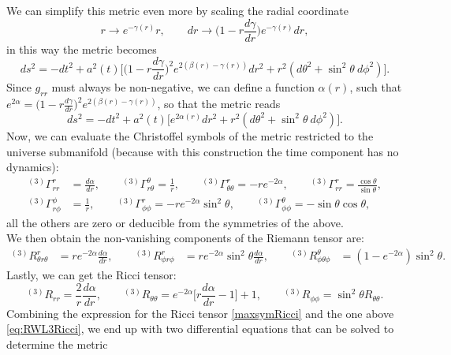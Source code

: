 We can simplify this metric even more by scaling the radial coordinate
\begin{equation*}
    r\rightarrow e^{-\gamma(r)}r,\qquad dr\rightarrow \bigg(1-r\frac{d\gamma}{dr}\bigg)e^{-\gamma(r)}dr,
\end{equation*}
in this way the metric becomes
\begin{equation*}
    ds^2=-dt^2+a^2(t)\Bigg[\bigg(1-r\frac{d\gamma}{dr}\bigg)^{2}e^{2(\beta(r)-\gamma(r))}dr^2+r^2(d\theta^2+\sin^2\theta\ d\phi^2)\Bigg].
\end{equation*}
Since $g_{rr}$ must always be non-negative, we can define a function $\alpha(r)$, such that $e^{2\alpha}=\big(1-r\frac{d\gamma}{dr}\big)^{2}e^{2(\beta(r)-\gamma(r))}$, so that the metric reads
\begin{equation*}
    ds^2=-dt^2+a^2(t)\big[e^{2\alpha(r)}dr^2+r^2(d\theta^2+\sin^2\theta\ d\phi^2)\big].
\end{equation*}
Now, we can evaluate the Christoffel symbols of the metric restricted to the universe submanifold (because with this construction the time component has no dynamics):
\begin{align}\label{eq:RWL3Christoffel}
    ^{(3)}\Gamma_{rr}^r&=\frac{d\alpha}{dr},\qquad^{(3)}\Gamma_{r\theta}^\theta=\frac{1}{r},\qquad^{(3)}\Gamma_{\theta\theta}^r=-re^{-2\alpha},\qquad^{(3)}\Gamma_{rr}^r=\frac{\cos\theta}{\sin\theta},\nonumber\\
    ^{(3)}\Gamma_{r\phi}^\phi&=\frac{1}{r},\qquad^{(3)}\Gamma_{\phi\phi}^r=-re^{-2\alpha}\sin^2\theta,\qquad^{(3)}\Gamma_{\phi\phi}^\theta=-\sin\theta\cos\theta,
\end{align}
all the others are zero or deducible from the symmetries of the above.\\ We then obtain the non-vanishing components of the Riemann tensor are:
\begin{align}\label{eq:RWL3Riemann}
    ^{(3)}R^r_{\theta r\theta}&=re^{-2\alpha}\frac{d\alpha}{dr},\qquad
    ^{(3)}R^r_{\phi r\phi}&=re^{-2\alpha}\sin^2\theta\frac{d\alpha}{dr},\qquad
    ^{(3)}R^\theta_{\phi \theta\phi}&=(1-e^{-2\alpha})\sin^2\theta.
\end{align}
Lastly, we can get the Ricci tensor:
\begin{equation}\label{eq:RWL3Ricci}
    ^{(3)}R_{rr}=\frac{2}{r}\frac{d\alpha}{dr},\qquad ^{(3)}R_{\theta\theta}=e^{-2\alpha}\bigg[r\frac{d\alpha}{dr}-1\bigg]+1,\qquad ^{(3)}R_{\phi\phi}=\sin^2\theta R_{\theta\theta}.
\end{equation}
Combining the expression for the Ricci tensor \eqref{maxsymRicci} and the one above \eqref{eq:RWL3Ricci}, we end up with two differential equations that can be solved to determine the metric

